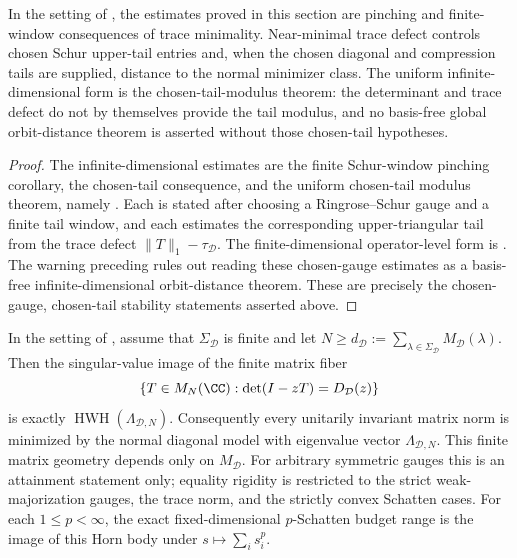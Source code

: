 \begin{corollary}
  \label{cor:trace-rigidity-stability-boundary-package}
  In the setting of , the
  estimates proved in this section are pinching and finite-window consequences of
  trace minimality.  Near-minimal trace defect controls chosen Schur upper-tail
  entries and, when the chosen diagonal and compression tails are supplied,
  distance to the normal minimizer class.  The uniform infinite-dimensional
  form is the chosen-tail-modulus theorem: the determinant and trace defect do
  not by themselves provide the tail modulus, and no basis-free global
  orbit-distance theorem is asserted without those chosen-tail hypotheses.
\end{corollary}

\begin{proof}
  The infinite-dimensional estimates are the finite Schur-window pinching
  corollary, the chosen-tail consequence, and the uniform chosen-tail modulus
  theorem, namely
  .
  Each is stated after choosing a Ringrose--Schur gauge and a finite tail
  window, and each estimates the corresponding upper-triangular tail from the
  trace defect \(\|T\|_1-\tau_{\mathcal D}\).  The finite-dimensional
  operator-level form is .  The
  warning preceding  rules out reading these
  chosen-gauge estimates as a basis-free infinite-dimensional orbit-distance
  theorem.  These are precisely the chosen-gauge, chosen-tail stability statements asserted above.
\end{proof}

\begin{corollary}
  \label{cor:trace-rigidity-finite-horn-package}
  In the setting of , assume that
  \(\Sigma_{\mathcal D}\) is finite and let
  \(N\ge d_{\mathcal D}:=\sum_{\lambda\in\Sigma_{\mathcal D}}
  M_{\mathcal D}(\lambda)\).  Then the singular-value image of the finite
  matrix fiber
  \[
    \{T\in M_N(\CC):\det(I-zT)=D_{\mathcal D}(z)\}
  \]
  is exactly \(\operatorname{HWH}(\Lambda_{\mathcal D,N})\). Consequently every
  unitarily invariant matrix norm is minimized by the normal diagonal model
  with eigenvalue vector \(\Lambda_{\mathcal D,N}\). This finite matrix geometry
  depends only on \(M_{\mathcal D}\). For arbitrary symmetric gauges this is an
  attainment statement only; equality rigidity is restricted to the strict
  weak-majorization gauges, the trace norm, and the strictly convex Schatten
  cases.  For each \(1\le p<\infty\), the exact fixed-dimensional
  \(p\)-Schatten budget range is the image of this Horn body under
  \(s\mapsto\sum_i s_i^p\).
\end{corollary}

